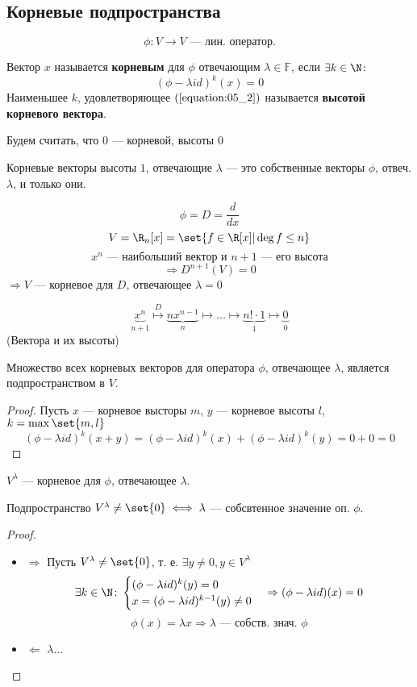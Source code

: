 \subsection{Корневые подпространства}
\[
\phi \colon V \rightarrow V \text{ --- лин. оператор.}
\]
\begin{definition}
  Вектор $x$ называется \textbf{корневым} для $\phi$ отвечающим $\lambda \in \mathbb{F}$, если $\exists k \in \N\colon$
  \begin{equation}
    \label{equation:05_2}
    (\phi - \lambda id)^{k}(x) = 0
  \end{equation}
  Наименьшее $k$, удовлетворяющее $(\ref{equation:05_2})$ называется \textbf{высотой корневого вектора}.
\end{definition}
\begin{note}
  Будем считать, что $0$ --- корневой, высоты $0$
\end{note}
Корневые векторы высоты $1$, отвечающие $\lambda$ --- это собственные векторы $\phi$, отвеч. $\lambda$, и только они.
\begin{example}
  \[
  \phi = D = \frac{d}{dx}
\]
 \[
 V = \R_{n}[x] = \set{f \in \R[x] | \deg f \leq n}
 \] 
 \[
  x^{n} \text{ --- наибольший вектор и $n + 1$ --- его высота}
 \]
 \[
 \Rightarrow D^{n + 1}(V) = 0
 \]
 $\Rightarrow V$ --- корневое для $D$, отвечающее $\lambda = 0$
\end{example}
\[
\underbrace{x^{n}}_{n + 1} \overset{D}{\mapsto} \underbrace{n x^{n - 1}}_{n} \mapsto \ldots \mapsto \underbrace{n! \cdot 1}_{1} \mapsto \underbrace{0}_{0}
\]
(Вектора и их высоты)
\begin{statement}
  \label{statement:05_2}
  Множество всех корневых векторов для оператора $\phi$, отвечающее $\lambda$, является подпространством в $V$.
\end{statement}
\begin{proof}
  Пусть $x$ --- корневое высторы $m$, $y$ --- корневое высоты $l$, $k = \max \set{m, l}$
  \[
    (\phi - \lambda id)^{k}(x + y) = (\phi - \lambda id)^{k}(x) + (\phi - \lambda id)^{k}(y) = 0 + 0 = 0
  \]
\end{proof}
\begin{symb}
  $V^{\lambda}$ --- корневое для $\phi$, отвечающее $\lambda$.
\end{symb}
\begin{statement}
  \label{statement:05_3}
  Подпространство $V^{\lambda} \neq \set{0} \iff \lambda$ --- собсвтенное значение оп. $\phi$.
\end{statement}
\begin{proof}
  \begin{itemize}
    \item $\Rightarrow$
  Пусть $V^{\lambda} \neq \set{0}$, т. е. $\exists y \neq 0, y \in V^{\lambda}$
  \[
  \exists k \in \N\colon \begin{cases}
    (\phi - \lambda id)^{k} (y) = 0 \\
    x = (\phi - \lambda id)^{k - 1}(y) \neq 0
  \end{cases} \Rightarrow (\phi - \lambda id)(x) = 0
  \]
  \[
  \phi(x) = \lambda x \Rightarrow \lambda \text{ --- собств. знач. $\phi$}
  \]
\item $\Leftarrow$ $\lambda...$
  \end{itemize}
\end{proof}
